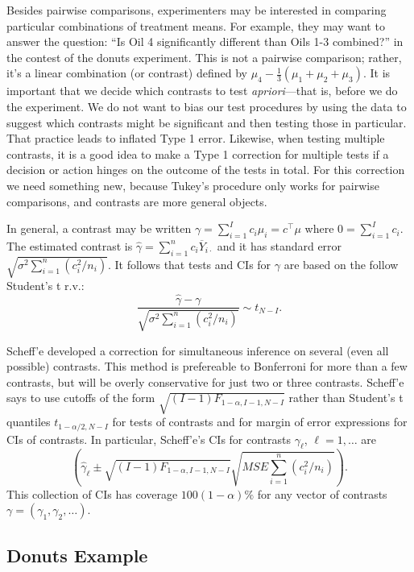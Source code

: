 \documentclass[
]{book}
\begin{document}
Besides pairwise comparisons, experimenters may be interested in comparing particular combinations of treatment means. For example, they may want to answer the question: ``Is Oil 4 significantly different than Oils 1-3 combined?'' in the contest of the donuts experiment. This is not a pairwise comparison; rather, it's a linear combination (or contrast) defined by \(\mu_4 - \tfrac13(\mu_1+\mu_2+\mu_3)\). It is important that we decide which contrasts to test \emph{apriori}---that is, before we do the experiment. We do not want to bias our test procedures by using the data to suggest which contrasts might be significant and then testing those in particular. That practice leads to inflated Type 1 error. Likewise, when testing multiple contrasts, it is a good idea to make a Type 1 correction for multiple tests if a decision or action hinges on the outcome of the tests in total. For this correction we need something new, because Tukey's procedure only works for pairwise comparisons, and contrasts are more general objects.

In general, a contrast may be written \(\gamma = \sum_{i=1}^I c_i\mu_i = c^\top \mu\) where \(0=\sum_{i=1}^I c_i\). The estimated contrast is \(\hat\gamma = \sum_{i=1}^n c_i\overline Y_{i\cdot}\) and it has standard error \(\sqrt{\sigma^2\sum_{i=1}^n (c_i^2/n_i)}\). It follows that tests and CIs for \(\gamma\) are based on the follow Student's t r.v.:
\[\frac{\hat\gamma - \gamma}{\sqrt{\sigma^2\sum_{i=1}^n (c_i^2/n_i)}}\sim t_{N-I}.\]

Scheff'e developed a correction for simultaneous inference on several (even all possible) contrasts. This method is prefereable to Bonferroni for more than a few contrasts, but will be overly conservative for just two or three contrasts. Scheff'e says to use cutoffs of the form \(\sqrt{(I-1)F_{1-\alpha, I-1, N-I}}\) rather than Student's t quantiles \(t_{1-\alpha/2, N-I}\) for tests of contrasts and for margin of error expressions for CIs of contrasts. In particular, Scheff'e's CIs for contrasts \(\gamma_\ell\), \(\ell=1,\ldots\) are
\[\left(\hat\gamma_\ell \pm \sqrt{(I-1)F_{1-\alpha, I-1, N-I}}\sqrt{MSE\sum_{i=1}^n (c_i^2/n_i)}\right).\]
This collection of CIs has coverage \(100(1-\alpha)\%\) for any vector of contrasts \(\gamma = (\gamma_1, \gamma_2, \ldots )\).

\hypertarget{donuts-example-1}{%
\subsection{Donuts Example}\label{donuts-example-1}}
\end{document}

